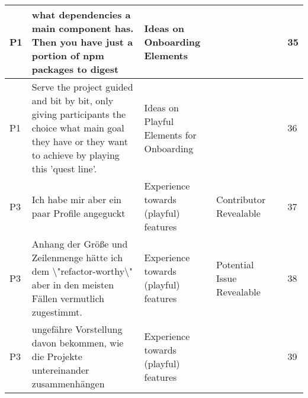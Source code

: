 \begin{appendices}
\begin{landscape}
\begin{longtable}{|p{0.8cm}|p{7cm}|p{3cm}|p{3cm}|p{5.5cm}|p{0.5cm}|}
      P1                   & what dependencies a main component has. Then you have just a portion of npm packages to digest                                                                                                                                                                              & Ideas on Onboarding Elements             &                                    &                                                                                                                                                    & 35           \\ \hline
      P1                   & Serve the project guided and bit by bit, only giving participants the choice what main goal they have or they want to achieve by playing this 'quest line'.                                                                                                                 & Ideas on Playful Elements for Onboarding &                                    &                                                                                                                                                    & 36           \\ \hline
      P3                   & Ich habe mir aber ein paar Profile angeguckt                                                                                                                                                                                                                                & Experience towards (playful) features    & Contributor Revealable             &                                                                                                                                                    & 37           \\ \hline
      P3                   & Anhang der Größe und Zeilenmenge hätte ich dem \textbackslash{}"refactor-worthy\textbackslash{}" aber in den meisten Fällen vermutlich zugestimmt.                                                                                                                          & Experience towards (playful) features    & Potential Issue Revealable         &                                                                                                                                                    & 38           \\ \hline
      P3                   & ungefähre Vorstellung davon bekommen, wie die Projekte untereinander zusammenhängen                                                                                                                                                                                         & Experience towards (playful) features    &                                    &                                                                                                                                                    & 39           \\ \hline

\end{longtable}
\end{landscape}
\end{appendices}
